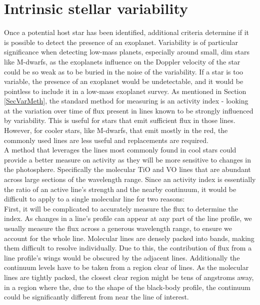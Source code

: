 \chapter{Intrinsic stellar variability}
\label{chapISV}
Once a potential host star has been identified, additional criteria determine if it is possible to detect the presence of an exoplanet. Variability is of particular significance when detecting low-mass planets, especially around small, dim stars like M-dwarfs, as the exoplanets influence on the Doppler velocity of the star could be so weak as to be buried in the noise of the variability. If a star is too variable, the presence of an exoplanet would be undetectable, and it would be pointless to include it in a low-mass exoplanet survey. As mentioned in Section\,\ref{SecVarMeth}, the standard method for measuring is an activity index - looking at the variation over time of flux present in lines known to be strongly influenced by variability. This is useful for stars that emit sufficient flux in those lines. However, for cooler stars, like M-dwarfs, that emit mostly in the red, the commonly used lines are less useful and replacements are required.\\

A method that leverages the lines most commonly found in cool stars could provide a better measure on activity as they will be more sensitive to changes in the photosphere. Specifically the molecular TiO and VO lines that are abundant across large sections of the wavelength range. Since an activity index is essentially the ratio of an active line's strength and the nearby continuum, it would be difficult to apply to a single molecular line for two reasons:\\

First, it will be complicated to accurately measure the flux to determine the index. As changes in a line's profile can appear at any part of the line profile, we usually measure the flux across a generous wavelength range, to ensure we account for the whole line. Molecular lines are densely packed into bands, making them difficult to resolve individually. Due to this, the contribution of flux from a line profile's wings would be obscured by the adjacent lines. Additionally the continuum levels have to be taken from a region clear of lines. As the molecular lines are tightly packed, the closest clear region might be tens of angstroms away, in a region where the, due to the shape of the black-body profile, the continuum could be significantly different from near the line of interest.\\

